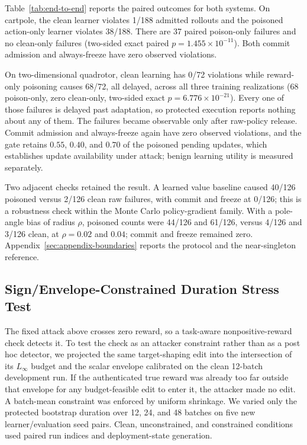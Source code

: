\begin{table}[t]
\centering
\caption{Paired reward-record poisoning and snapshot admission. ``Commit''
denotes finite-horizon admission; permanent mechanisms use the common-state
audit in Fig.~\ref{fig:unified-frontier}. Raw-snapshot rewards after failure
are descriptive, not utility comparisons.}
\label{tab:end-to-end}

\end{table}

Table~\ref{tab:end-to-end} reports the paired outcomes for both systems.
On cartpole, the clean learner violates 1/188 admitted rollouts and the
poisoned action-only learner violates 38/188.  There are 37 paired poison-only
failures and no clean-only failures (two-sided exact paired
$p=1.455\times 10^{-11}$).  Both commit admission and always-freeze have zero
observed violations.

On two-dimensional quadrotor, clean learning has 0/72 violations while
reward-only poisoning causes 68/72, all delayed, across all three training
realizations (68 poison-only, zero clean-only, two-sided exact
$p=6.776\times10^{-21}$).  Every one of those failures is delayed past
adaptation, so protected execution reports nothing about any of them.  The
failures became observable only after raw-policy release.  Commit
admission and always-freeze again have zero observed violations, and the gate
retains $0.55$, $0.40$, and $0.70$ of the poisoned pending updates, which
establishes update availability under attack; benign learning utility is
measured separately.

Two adjacent checks retained the result.  A learned value baseline caused
40/126 poisoned versus 2/126 clean raw failures, with commit and freeze at
0/126; this is a robustness check within the Monte Carlo policy-gradient
family.  With a pole-angle bias of radius $\rho$, poisoned counts were 44/126 and 61/126,
versus 4/126 and 3/126 clean, at $\rho=0.02$ and $0.04$; commit and freeze
remained zero.  Appendix~\ref{sec:appendix-boundaries} reports the protocol
and the near-singleton reference.

\subsection{Sign/Envelope-Constrained Duration Stress Test}
\label{sec:constrained}

The fixed attack above crosses zero reward, so a task-aware nonpositive-reward
check detects it.  To test the check as an attacker constraint rather than as a
post hoc detector, we projected the same target-shaping edit into the
intersection of its $L_\infty$ budget and the scalar envelope calibrated on the
clean 12-batch development run.  If the authenticated true reward was already
too far outside that envelope for any budget-feasible edit to enter it, the
attacker made no edit.  A batch-mean constraint was enforced by uniform
shrinkage.  We varied only the protected bootstrap duration over 12, 24, and 48
batches on five new learner/evaluation seed pairs.  Clean, unconstrained, and
constrained conditions used paired run indices and deployment-state generation.

